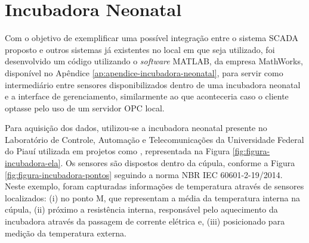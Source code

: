 \section{Incubadora Neonatal}
\label{sec:incubadora-neonatal}
Com o objetivo de exemplificar uma possível integração entre o sistema \gls{SCADA} proposto e outros sistemas já existentes no local em que seja utilizado, foi desenvolvido um código utilizando o \textit{software} MATLAB, da empresa MathWorks, disponível no Apêndice \ref{ap:apendice-incubadora-neonatal}, para servir como intermediário entre sensores disponibilizados dentro de uma incubadora neonatal e a interface de gerenciamento, similarmente ao que aconteceria caso o cliente optasse pelo uso de um servidor \gls{OPC} local. 
        \begin{figure}[!h]
    	\end{figure}
    	
Para aquisição dos dados, utilizou-se a incubadora neonatal presente no Laboratório de Controle, Automação e Telecomunicações da Universidade Federal do Piauí utilizada em projetos como , representada na Figura \ref{fig:figura-incubadora-ela}. Os sensores são dispostos dentro da cúpula, conforme a Figura \ref{fig:figura-incubadora-pontos} seguindo a norma NBR IEC 60601-2-19/2014. Neste exemplo, foram capturadas informações de temperatura através de sensores localizados: (i) no ponto M, que representam a média da temperatura interna na cúpula, (ii) próximo a resistência interna, responsável pelo aquecimento da incubadora através da passagem de corrente elétrica  e, (iii) posicionado para medição da temperatura externa.
    	
